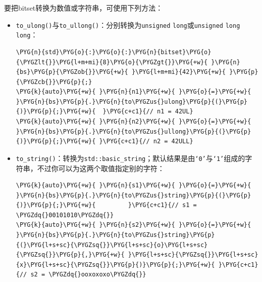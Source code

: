 
要把bitset转换为数值或字符串，可使用下列方法：



\begin{itemize}
\item \texttt{to\_\allowbreak{}ulong()}与\texttt{to\_\allowbreak{}ullong()}：分别转换为\texttt{unsigned} \texttt{long}或\texttt{unsigned} \texttt{long long}：



\begin{codeblockbg}
\begin{Verbatim}[commandchars=\\\{\},breaklines=true,breakanywhere=true,fontsize=\codefont,xleftmargin=17bp]
\PYG{n}{std}\PYG{o}{:}\PYG{o}{:}\PYG{n}{bitset}\PYG{o}{\PYGZlt{}}\PYG{l+m+mi}{8}\PYG{o}{\PYGZgt{}}\PYG{+w}{ }\PYG{n}{bs}\PYG{p}{\PYGZob{}}\PYG{+w}{ }\PYG{l+m+mi}{42}\PYG{+w}{ }\PYG{p}{\PYGZcb{}}\PYG{p}{;}
\PYG{k}{auto}\PYG{+w}{ }\PYG{n}{n1}\PYG{+w}{ }\PYG{o}{=}\PYG{+w}{ }\PYG{n}{bs}\PYG{p}{.}\PYG{n}{to\PYGZus{}ulong}\PYG{p}{(}\PYG{p}{)}\PYG{p}{;}\PYG{+w}{  }\PYG{c+c1}{// n1 = 42UL}
\PYG{k}{auto}\PYG{+w}{ }\PYG{n}{n2}\PYG{+w}{ }\PYG{o}{=}\PYG{+w}{ }\PYG{n}{bs}\PYG{p}{.}\PYG{n}{to\PYGZus{}ullong}\PYG{p}{(}\PYG{p}{)}\PYG{p}{;}\PYG{+w}{ }\PYG{c+c1}{// n2 = 42ULL}
\end{Verbatim}
\end{codeblockbg}



\item \texttt{to\_\allowbreak{}string()}：转换为\texttt{std::\allowbreak{}basic\_\allowbreak{}string}；默认结果是由\texttt{‘0’}与\texttt{‘1’}组成的字符串，不过你可以为这两个取值指定别的字符：



\begin{codeblockbg}
\begin{Verbatim}[commandchars=\\\{\},breaklines=true,breakanywhere=true,fontsize=\codefont,xleftmargin=17bp]
\PYG{k}{auto}\PYG{+w}{ }\PYG{n}{s1}\PYG{+w}{ }\PYG{o}{=}\PYG{+w}{ }\PYG{n}{bs}\PYG{p}{.}\PYG{n}{to\PYGZus{}string}\PYG{p}{(}\PYG{p}{)}\PYG{p}{;}\PYG{+w}{         }\PYG{c+c1}{// s1 = \PYGZdq{}00101010\PYGZdq{}}
\PYG{k}{auto}\PYG{+w}{ }\PYG{n}{s2}\PYG{+w}{ }\PYG{o}{=}\PYG{+w}{ }\PYG{n}{bs}\PYG{p}{.}\PYG{n}{to\PYGZus{}string}\PYG{p}{(}\PYG{l+s+sc}{\PYGZsq{}}\PYG{l+s+sc}{o}\PYG{l+s+sc}{\PYGZsq{}}\PYG{p}{,}\PYG{+w}{ }\PYG{l+s+sc}{\PYGZsq{}}\PYG{l+s+sc}{x}\PYG{l+s+sc}{\PYGZsq{}}\PYG{p}{)}\PYG{p}{;}\PYG{+w}{ }\PYG{c+c1}{// s2 = \PYGZdq{}ooxoxoxo\PYGZdq{}}
\end{Verbatim}
\end{codeblockbg}

\end{itemize}


